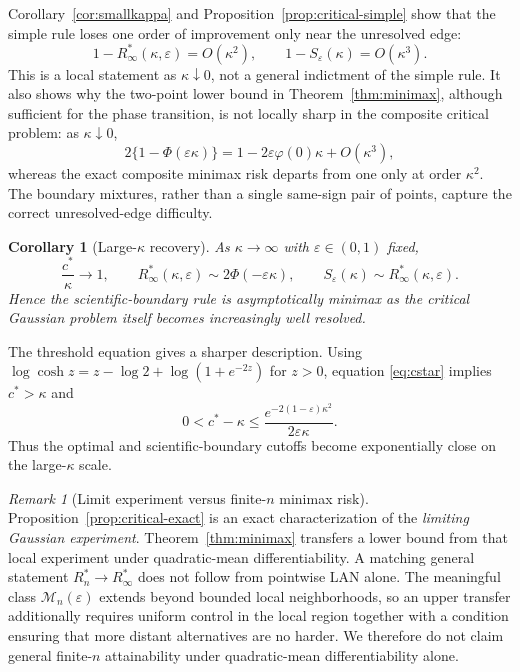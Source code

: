 \documentclass[11pt]{article}
\newtheorem{corollary}{Corollary}
\theoremstyle{remark}
\newtheorem{remark}{Remark}
\begin{document}
Corollary~\ref{cor:smallkappa} and Proposition~\ref{prop:critical-simple} show that the simple rule loses one order of improvement only near the unresolved edge:
\[
1-R_\infty^*(\kappa,\varepsilon)=O(\kappa^2),
\qquad
1-S_\varepsilon(\kappa)=O(\kappa^3).
\]
This is a local statement as $\kappa\downarrow0$, not a general indictment of the simple rule. It also shows why the two-point lower bound in Theorem~\ref{thm:minimax}, although sufficient for the phase transition, is not locally sharp in the composite critical problem: as $\kappa\downarrow0$,
\[
2\{1-\Phi(\varepsilon\kappa)\}
=
1-2\varepsilon\varphi(0)\kappa+O(\kappa^3),
\]
whereas the exact composite minimax risk departs from one only at order $\kappa^2$. The boundary mixtures, rather than a single same-sign pair of points, capture the correct unresolved-edge difficulty.

\begin{corollary}[Large-$\kappa$ recovery]
\label{cor:largekappa}
As $\kappa\to\infty$ with $\varepsilon\in(0,1)$ fixed,
\[
\frac{c^*}{\kappa}\to1,
\qquad
R_\infty^*(\kappa,\varepsilon)
\sim
2\Phi(-\varepsilon\kappa),
\qquad
S_\varepsilon(\kappa)
\sim
R_\infty^*(\kappa,\varepsilon).
\]
Hence the scientific-boundary rule is asymptotically minimax as the critical Gaussian problem itself becomes increasingly well resolved.
\end{corollary}

The threshold equation gives a sharper description. Using
$\log\cosh z=z-\log2+\log(1+e^{-2z})$ for $z>0$, equation \eqref{eq:cstar} implies $c^*>\kappa$ and
\[
0<c^*-\kappa
\le
\frac{e^{-2(1-\varepsilon)\kappa^2}}{2\varepsilon\kappa}.
\]
Thus the optimal and scientific-boundary cutoffs become exponentially close on the large-$\kappa$ scale.

\begin{remark}[Limit experiment versus finite-$n$ minimax risk]
\label{rem:transfer}
Proposition~\ref{prop:critical-exact} is an exact characterization of the \emph{limiting Gaussian experiment}. Theorem~\ref{thm:minimax} transfers a lower bound from that local experiment under quadratic-mean differentiability. A matching general statement $R_n^*\to R_\infty^*$ does not follow from pointwise LAN alone. The meaningful class $\mathcal M_n(\varepsilon)$ extends beyond bounded local neighborhoods, so an upper transfer additionally requires uniform control in the local region together with a condition ensuring that more distant alternatives are no harder. We therefore do not claim general finite-$n$ attainability under quadratic-mean differentiability alone.
\end{remark}
\end{document}
